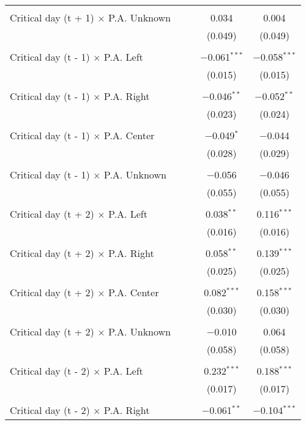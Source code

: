 \documentclass[
]{article}
\begin{document}
\begin{table}[!htbp]
{\begin{tabular}{@{\extracolsep{5pt}}lcccc}
  & & & & \\ 
 Critical day (t + 1) $\times$ P.A. Unknown &  &  & 0.034 & 0.004 \\ 
  &  &  & (0.049) & (0.049) \\ 
  & & & & \\ 
 Critical day (t - 1) $\times$ P.A. Left &  &  & $-$0.061$^{***}$ & $-$0.058$^{***}$ \\ 
  &  &  & (0.015) & (0.015) \\ 
  & & & & \\ 
 Critical day (t - 1) $\times$ P.A. Right &  &  & $-$0.046$^{**}$ & $-$0.052$^{**}$ \\ 
  &  &  & (0.023) & (0.024) \\ 
  & & & & \\ 
 Critical day (t - 1) $\times$ P.A. Center &  &  & $-$0.049$^{*}$ & $-$0.044 \\ 
  &  &  & (0.028) & (0.029) \\ 
  & & & & \\ 
 Critical day (t - 1) $\times$ P.A. Unknown &  &  & $-$0.056 & $-$0.046 \\ 
  &  &  & (0.055) & (0.055) \\ 
  & & & & \\ 
 Critical day (t + 2) $\times$ P.A. Left &  &  & 0.038$^{**}$ & 0.116$^{***}$ \\ 
  &  &  & (0.016) & (0.016) \\ 
  & & & & \\ 
 Critical day (t + 2) $\times$ P.A. Right &  &  & 0.058$^{**}$ & 0.139$^{***}$ \\ 
  &  &  & (0.025) & (0.025) \\ 
  & & & & \\ 
 Critical day (t + 2) $\times$ P.A. Center &  &  & 0.082$^{***}$ & 0.158$^{***}$ \\ 
  &  &  & (0.030) & (0.030) \\ 
  & & & & \\ 
 Critical day (t + 2) $\times$ P.A. Unknown &  &  & $-$0.010 & 0.064 \\ 
  &  &  & (0.058) & (0.058) \\ 
  & & & & \\ 
 Critical day (t - 2) $\times$ P.A. Left &  &  & 0.232$^{***}$ & 0.188$^{***}$ \\ 
  &  &  & (0.017) & (0.017) \\ 
  & & & & \\ 
 Critical day (t - 2) $\times$ P.A. Right &  &  & $-$0.061$^{**}$ & $-$0.104$^{***}$ \\ 

\end{tabular}}
\end{table}
\end{document}
